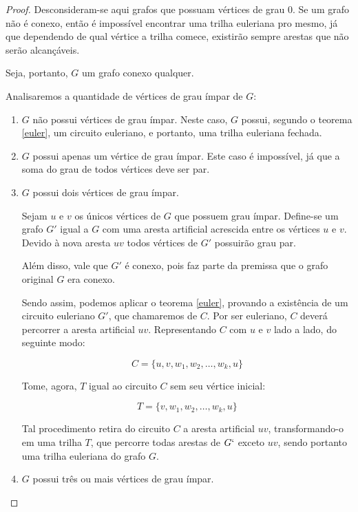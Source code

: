 \begin{proof}
    Desconsideram-se aqui grafos que possuam vértices de grau $0$.
    Se um grafo não é conexo, então é impossível encontrar uma trilha euleriana pro mesmo, já que dependendo de qual vértice a trilha comece, existirão sempre arestas que não serão alcançáveis.

    Seja, portanto, $G$ um grafo conexo qualquer. 

    Analisaremos a quantidade de vértices de grau ímpar de $G$:
    \begin{enumerate}
        \item $G$ não possui vértices de grau ímpar. Neste caso, $G$ possui, segundo o teorema \ref{euler}, um circuito euleriano, e portanto, uma trilha euleriana fechada.
        
        \item $G$ possui apenas um vértice de grau ímpar. 
			Este caso é impossível, já que a soma do grau de todos vértices deve ser par.
        
        \item $G$ possui dois vértices de grau ímpar. 

			Sejam $u$ e $v$ os únicos vértices de $G$ que possuem grau ímpar.
            Define-se um grafo $G'$ igual a $G$ com uma aresta artificial acrescida entre os vértices $u$ e $v$.
			Devido à nova aresta $uv$ todos vértices de $G'$ possuirão grau par. 

			Além disso, vale que $G'$ é conexo, pois faz parte da premissa que o grafo original $G$ era conexo.

			Sendo assim, podemos aplicar o teorema \ref{euler}, provando a existência de um circuito euleriano $G'$, que chamaremos de $C$.
            Por ser euleriano, $C$ deverá percorrer a aresta artificial $uv$.
            Representando $C$ com $u$ e $v$ lado a lado, do seguinte modo:
		
			\[
				C = \{u, v, w_1, w_2, \dots, w_k, u\}
			\]


            Tome, agora, $T$ igual ao circuito $C$ sem seu vértice inicial:

            \[
                T = \{v, w_1, w_2, \dots, w_k, u\}
			\]

            Tal procedimento retira do circuito $C$ a aresta artificial $uv$, transfor\-mando-o em uma trilha $T$, que percorre todas arestas de $G`$ exceto $uv$, sendo portanto uma trilha euleriana do grafo $G$.

        \item $G$ possui três ou mais vértices de grau ímpar. 


\end{enumerate}
\end{proof}
